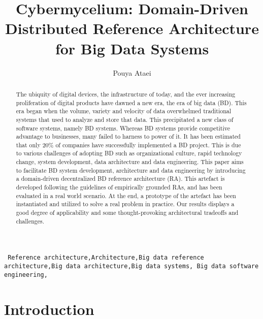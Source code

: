 \documentclass[review]{elsarticle}
\begin{document}
\begin{frontmatter}

\title{Cybermycelium: Domain-Driven Distributed Reference Architecture for Big Data Systems}

\author{Pouya Ataei}

\address[mymainaddress]{School of Engineering, Computer and Mathematical Sciences, Auckland University of Technology, Auckland, New Zealand}


\begin{abstract}
The ubiquity of digital devices, the infrastructure of today, and the ever increasing proliferation of digital products have dawned a new era, the era of big data (BD). This era began when the volume, variety and velocity of data overwhelmed traditional systems that used to analyze and store that data. This precipitated a new class of software systems, namely BD systems. Whereas BD systems provide competitive advantage to businesses, many failed to harness to power of it. It has been estimated that only 20\% of companies have successfully implemented a BD project. This is due to various challenges of adopting BD such as organizational culture, rapid technology change, system development, data architecture and data engineering. This paper aims to facilitate BD system development, architecture and data engineering by introducing a domain-driven decentralized BD reference architecture (RA). This artefact is developed following the guidelines of empirically grounded RAs, and has been evaluated in a real world scenario. At the end, a prototype of the artefact has been instantiated and utilized to solve a real problem in practice. Our results displays a good degree of applicability and some thought-provoking architectural tradeoffs and challenges.
\end{abstract}

\begin{keyword}
\texttt{ Reference architecture\sep Architecture\sep Big data
reference architecture\sep Big data architecture\sep Big data systems\sep
Big data software engineering\sep}
\end{keyword}

\end{frontmatter}

\linenumbers


\section{Introduction}
\end{document}
